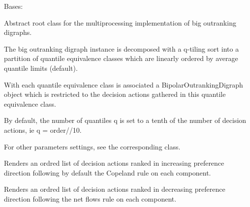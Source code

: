 \documentclass[letterpaper,10pt,english]{sphinxmanual}
\begin{document}
\begin{fulllineitems}
\label{techDoc:bigOutrankingDigraphs.BigOutrankingDigraph}
Bases: {\hyperref[techDoc:bigOutrankingDigraphs.BigDigraph]{\emph{}}}

Abstract root class  for the multiprocessing implementation of big outranking digraphs.

The big outranking digraph instance is decomposed with a q-tiling sort into a partition
of quantile equivalence classes which are linearly ordered by average quantile limits (default).

With each quantile equivalence class is associated a BipolarOutrankingDigraph object
which is restricted to the decision actions gathered in this quantile equivalence class.

By default, the number of quantiles q is set to a tenth of the number of decision actions,
ie q = order//10.

For other parameters settings, see the corresponding {\hyperref[techDoc:sortingDigraphs.QuantilesSortingDigraph]{\emph{}}} class.

\begin{fulllineitems}
\label{techDoc:bigOutrankingDigraphs.BigOutrankingDigraph.computeBoostedOrdering}
Renders an ordred list of decision actions ranked in
increasing preference direction following by default the Copeland rule
on each component.

\end{fulllineitems}


\begin{fulllineitems}
\label{techDoc:bigOutrankingDigraphs.BigOutrankingDigraph.computeBoostedRanking}
Renders an ordred list of decision actions ranked in
decreasing preference direction following the net flows rule
on each component.

\end{fulllineitems}



\end{fulllineitems}
\end{document}
